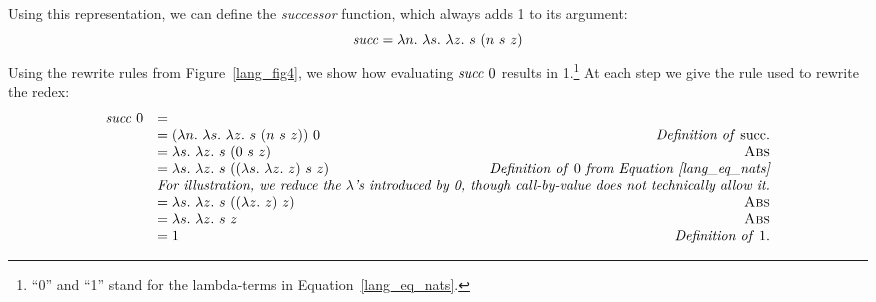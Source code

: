 \documentclass[12pt]{report}
\begin{document}
Using this representation, we can define the \emph{successor}
function, which always adds 1 to its argument:
\begin{equation}
  \mathit{succ} = \lambda n.\ \lambda s.\ \lambda z.\ s\ (n\ s\ z)
\end{equation}
Using the rewrite rules from Figure~\ref{lang_fig4}, we show how
evaluating $\mathit{succ}\ 0$ results in 1.\footnote{``0''
  and ``1'' stand for the lambda-terms in
  Equation~\ref{lang_eq_nats}.} At each step we give the rule used to
rewrite the redex:
\begin{equation*}
  \begin{array}{rlr}
    \lamApp{\mathit{succ}}{0} &= \\ 
    &= \lamAppP{\lamAbs{n}{\lamAbs{s}{\lamAbs{z}{\lamApPp{s}{\lamApp{n}{\lamApp{s}{z}}}}}}}{0} & \text{\emph{Definition of} succ.} \\
    &= \lamAbs{s}{\lamAbs{z}{\lamApPp{s}{\lamApp{0}{\lamApp{s}{z}}}}} & \text{\sc Abs} \\
    &= \lamAbs{s}{\lamAbs{z}{\lamApPp{s}{\lamAppP{\lamAbs{s}{\lamAbs{z}{z}}}{\lamApp{s}{z}}}}} & \text{\emph{Definition of}\ 0 \emph{from Equation~\ref{lang_eq_nats}}} \\
    & \multicolumn{2}{r}{\emph{For illustration, we reduce the $\lambda$'s introduced by 0, though call-by-value does not technically allow it.}} \\
    &= \lamAbs{s}{\lamAbs{z}{\lamApPp{s}{\lamAppP{\lamAbs{z}{z}}{z}}}}  & \text{\sc Abs} \\
    &= \lamAbs{s}{\lamAbs{z}{\lamApp{s}{z}}}  & \text{\sc Abs} \\
    &= 1 & \text{\emph{Definition of}\ 1.}
  \end{array}
\end{equation*}
\end{document}
